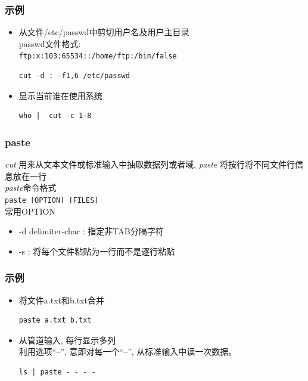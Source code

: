 \documentclass[compress]{beamer}
\begin{document}
\begin{frame}[fragile]
\frametitle{示例}

\begin{itemize}
\item 从文件/etc/passwd中剪切用户名及用户主目录 \\
passwd文件格式:\\
\verb~ftp:x:103:65534::/home/ftp:/bin/false~\\
\begin{Verbatim}
cut -d : -f1,6 /etc/passwd
\end{Verbatim}

\item 显示当前谁在使用系统\\
\begin{Verbatim}
who |  cut -c 1-8
\end{Verbatim}

\end{itemize}

\end{frame}

\begin{frame}[fragile]
\frametitle{paste}
\emph{cut} 用来从文本文件或标准输入中抽取数据列或者域, \emph{paste} 将按行将不同文件行信息放在一行\\
\emph{paste}命令格式\\
\verb~paste [OPTION] [FILES]~\\
常用OPTION
\begin{itemize}
\item -d delimiter-char : 指定非TAB分隔字符
\item -s : 将每个文件粘贴为一行而不是逐行粘贴
\end{itemize}
\end{frame}

\begin{frame}[fragile]
\frametitle{示例}

\begin{itemize}
\item 将文件a.txt和b.txt合并 \\
\begin{Verbatim}
paste a.txt b.txt
\end{Verbatim}

\item 从管道输入, 每行显示多列\\
利用选项``--'', 意即对每一个``--'', 从标准输入中读一次数据。\\
\begin{Verbatim}
ls | paste - - - -
\end{Verbatim}

\end{itemize}

\end{frame}
\end{document}
